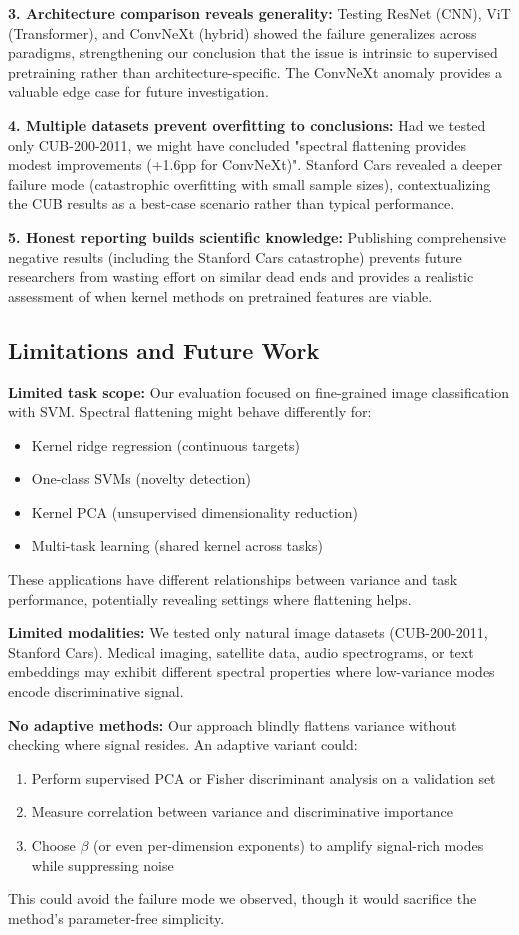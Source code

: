 \documentclass[11pt]{article}
\begin{document}
\textbf{3. Architecture comparison reveals generality:} Testing ResNet (CNN), ViT (Transformer), and ConvNeXt (hybrid) showed the failure generalizes across paradigms, strengthening our conclusion that the issue is intrinsic to supervised pretraining rather than architecture-specific. The ConvNeXt anomaly provides a valuable edge case for future investigation.

\textbf{4. Multiple datasets prevent overfitting to conclusions:} Had we tested only CUB-200-2011, we might have concluded "spectral flattening provides modest improvements (+1.6pp for ConvNeXt)". Stanford Cars revealed a deeper failure mode (catastrophic overfitting with small sample sizes), contextualizing the CUB results as a best-case scenario rather than typical performance.

\textbf{5. Honest reporting builds scientific knowledge:} Publishing comprehensive negative results (including the Stanford Cars catastrophe) prevents future researchers from wasting effort on similar dead ends and provides a realistic assessment of when kernel methods on pretrained features are viable.

\subsection{Limitations and Future Work}

\textbf{Limited task scope:} Our evaluation focused on fine-grained image classification with SVM. Spectral flattening might behave differently for:
\begin{itemize}
    \item Kernel ridge regression (continuous targets)
    \item One-class SVMs (novelty detection)
    \item Kernel PCA (unsupervised dimensionality reduction)
    \item Multi-task learning (shared kernel across tasks)
\end{itemize}
These applications have different relationships between variance and task performance, potentially revealing settings where flattening helps.

\textbf{Limited modalities:} We tested only natural image datasets (CUB-200-2011, Stanford Cars). Medical imaging, satellite data, audio spectrograms, or text embeddings may exhibit different spectral properties where low-variance modes encode discriminative signal.

\textbf{No adaptive methods:} Our approach blindly flattens variance without checking where signal resides. An adaptive variant could:
\begin{enumerate}
    \item Perform supervised PCA or Fisher discriminant analysis on a validation set
    \item Measure correlation between variance and discriminative importance
    \item Choose $\beta$ (or even per-dimension exponents) to amplify signal-rich modes while suppressing noise
\end{enumerate}
This could avoid the failure mode we observed, though it would sacrifice the method's parameter-free simplicity.
\end{document}
